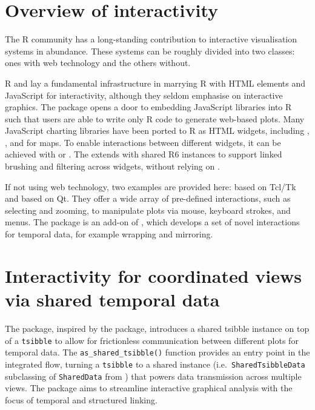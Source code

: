 \hypertarget{overview-of-interactivity}{%
\section{Overview of interactivity}\label{overview-of-interactivity}}

The R community has a long-standing contribution to interactive
visualisation systems in abundance. These systems can be roughly divided
into two classes: ones with web technology and the others without.

R  \citep{R-shiny} and 
\citep{R-htmlwidgets} lay a fundamental infrastructure in marrying R
with HTML elements and JavaScript for interactivity, although they
seldom emphasise on interactive graphics. The 
package opens a door to embedding JavaScript libraries into R such that
users are able to write only R code to generate web-based plots. Many
JavaScript charting libraries have been ported to R as HTML widgets,
including  \citep{plotly2020}, 
\citep{R-rbokeh}, and  \citep{R-leaflet} for maps. To
enable interactions between different widgets, it can be achieved with
 or  \citep{R-crosstalk}. The
 extends  with shared R6
instances to support linked brushing and filtering across widgets,
without relying on .

If not using web technology, two examples are provided here:
 \citep{R-loon} based on Tcl/Tk and 
\citep{xie_reactive_2014} based on Qt. They offer a wide array of
pre-defined interactions, such as selecting and zooming, to manipulate
plots via mouse, keyboard strokes, and menus. The 
package \citep{cheng_enabling_2016} is an add-on of , which
develops a set of novel interactions for temporal data, for example
wrapping and mirroring.

\hypertarget{interactivity-for-coordinated-views-via-shared-temporal-data}{%
\section{Interactivity for coordinated views via shared temporal
data}\label{interactivity-for-coordinated-views-via-shared-temporal-data}}

The  package, inspired by the 
package, introduces a shared tsibble instance on top of a
\texttt{tsibble} to allow for frictionless communication between
different plots for temporal data. The \texttt{as\_shared\_tsibble()}
function provides an entry point in the integrated flow, turning a
\texttt{tsibble} to a shared instance (i.e.~\texttt{SharedTsibbleData}
subclassing of \texttt{SharedData} from ) that powers
data transmission across multiple views. The 
package aims to streamline interactive graphical analysis with the focus
of temporal and structured linking.

